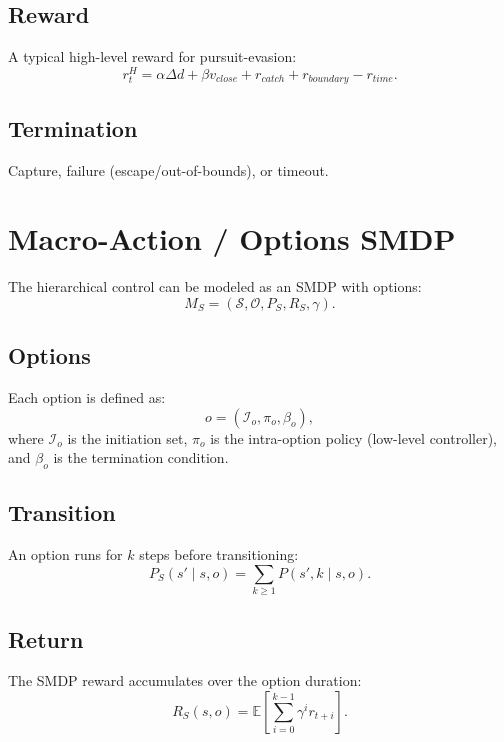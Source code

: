 \documentclass[11pt]{article}
\begin{document}
\subsection*{Reward}
A typical high-level reward for pursuit-evasion:
\begin{equation}
 r_t^H = \alpha\Delta d + \beta v_{close} + r_{catch} + r_{boundary} - r_{time}.
\end{equation}

\subsection*{Termination}
Capture, failure (escape/out-of-bounds), or timeout.

\section{Macro-Action / Options SMDP}
The hierarchical control can be modeled as an SMDP with options:
\begin{equation}
M_S = (\mathcal{S}, \mathcal{O}, P_S, R_S, \gamma).
\end{equation}

\subsection*{Options}
Each option is defined as:
\begin{equation}
 o = (\mathcal{I}_o, \pi_o, \beta_o),
\end{equation}
where $\mathcal{I}_o$ is the initiation set, $\pi_o$ is the intra-option policy (low-level controller), and $\beta_o$ is the termination condition.

\subsection*{Transition}
An option runs for $k$ steps before transitioning:
\begin{equation}
 P_S(s'\mid s,o) = \sum_{k\ge 1} P(s', k \mid s, o).
\end{equation}

\subsection*{Return}
The SMDP reward accumulates over the option duration:
\begin{equation}
 R_S(s,o) = \mathbb{E}\left[\sum_{i=0}^{k-1}\gamma^i r_{t+i}\right].
\end{equation}
\end{document}
